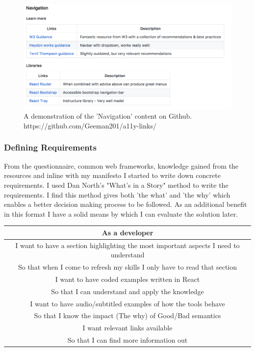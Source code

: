 \begin{figure}[H]
\centering
\includegraphics[width=\textwidth]{figures/documentation_link_example}
\captionsetup{justification=centering}
\caption{A demonstration of the 'Navigation' content on Github.
https://github.com/Geeman201/a11y-links/
\label{fig:allyLinksDemo}}
\end{figure}


\subsubsection{Defining Requirements}
From the questionnaire, common web frameworks, knowledge gained from the
resources and inline with my manifesto I started to write down concrete
requirements. I used Dan North's "What's in a Story" method to write the
requirements. I find this method gives both 'the what' and 'the why' which
enables a better decision making process to be followed. As an additional
benefit in this format I have a solid means by which I can evaluate the
solution later.

\begin{center}
 \begin{tabular}{| c |}
 \hline
 As a developer \\
 \hline
 I want to have a section highlighting the most important aspects I need to
 understand \\
 So that when I come to refresh my skills I only have to read that section  \\
 \hline
 I want to have coded examples written in React \\
 So that I can understand and apply the knowledge \\
 \hline
 I want to have audio/subtitled examples of how the tools behave  \\
 So that I know the impact (The why) of Good/Bad semantics  \\
 \hline
 I want relevant links available  \\
 So that I can find more information out  \\
 \hline
\end{tabular}
\end{center}

